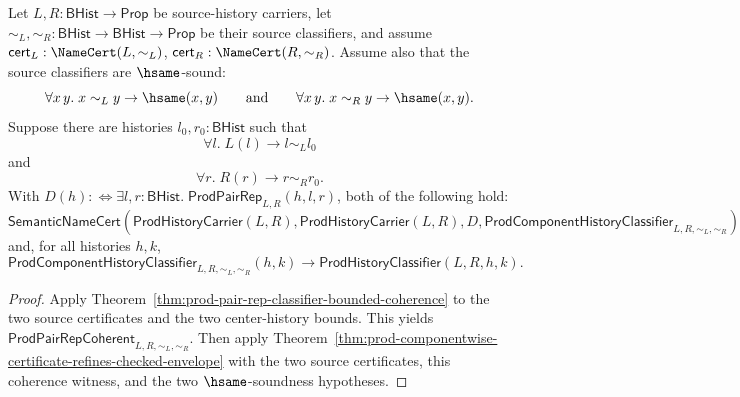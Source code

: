 \begin{theorem}
\label{thm:prod-classifier-bounded-componentwise-certificate-refines-envelope}
Let $L,R:\mathsf{BHist}\to\mathsf{Prop}$ be source-history carriers, let
$\sim_L,\sim_R:\mathsf{BHist}\to\mathsf{BHist}\to\mathsf{Prop}$ be their source
classifiers, and assume $\mathsf{cert}_L:\NameCert(L,\sim_L)$,
$\mathsf{cert}_R:\NameCert(R,\sim_R)$. Assume also that the source classifiers
are $\hsame$-sound:
$$
\forall x\,y.\;x\sim_L y\to\hsame(x,y)
\qquad\hbox{and}\qquad
\forall x\,y.\;x\sim_R y\to\hsame(x,y).
$$
Suppose there are histories $l_0,r_0:\mathsf{BHist}$ such that
$$
\forall l.\;L(l)\to l\sim_L l_0
$$
and
$$
\forall r.\;R(r)\to r\sim_R r_0.
$$
With $D(h):\Longleftrightarrow
\exists l,r:\mathsf{BHist}.\;\mathsf{ProdPairRep}_{L,R}(h,l,r)$, both of the
following hold:
$$
\mathsf{SemanticNameCert}(\mathsf{ProdHistoryCarrier}(L,R),
\mathsf{ProdHistoryCarrier}(L,R),
D,
\mathsf{ProdComponentHistoryClassifier}_{L,R,\sim_L,\sim_R})
$$
and, for all histories $h,k$,
$$
\mathsf{ProdComponentHistoryClassifier}_{L,R,\sim_L,\sim_R}(h,k)
\to
\mathsf{ProdHistoryClassifier}(L,R,h,k).
$$
\end{theorem}
\begin{proof}
Apply Theorem~\ref{thm:prod-pair-rep-classifier-bounded-coherence} to the two
source certificates and the two center-history bounds. This yields
$\mathsf{ProdPairRepCoherent}_{L,R,\sim_L,\sim_R}$. Then apply
Theorem~\ref{thm:prod-componentwise-certificate-refines-checked-envelope} with
the two source certificates, this coherence witness, and the two
$\hsame$-soundness hypotheses.
\end{proof}

